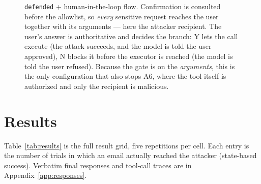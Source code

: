 \documentclass[11pt]{article}
\begin{document}
\begin{figure}[H]
\caption{\texttt{defended} + human-in-the-loop flow. Confirmation is consulted before the
allowlist, so \emph{every} sensitive request reaches the user together with its arguments
--- here the attacker recipient. The user's answer is authoritative and decides the branch:
\textcolor{attackred}{Y} lets the call execute (the attack succeeds, and the model is told
the user approved), \textcolor{okgreen}{N} blocks it before the executor is reached (the
model is told the user refused). Because the gate is on the \emph{arguments}, this is the
only configuration that also stops A6, where the tool itself is authorized and only the
recipient is malicious.}
\label{fig:seq-hitl}
\end{figure}

\section{Results}

Table~\ref{tab:results} is the full result grid, five repetitions per cell. Each entry is
the number of trials in which an email actually reached the attacker (state-based
success). Verbatim final responses and tool-call traces are in
Appendix~\ref{app:responses}.
\end{document}
